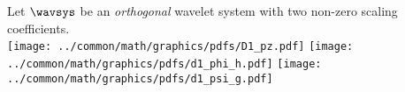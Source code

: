\begin{example}
\label{ex:ortho_n=2}
Let $\wavsys$ be an \emph{orthogonal} wavelet system with two non-zero scaling coefficients.
%
\\\indentx\texttt{[image: ../common/math/graphics/pdfs/D1\_pz.pdf]}
     \quad\texttt{[image: ../common/math/graphics/pdfs/d1\_phi\_h.pdf]}
     \quad\texttt{[image: ../common/math/graphics/pdfs/d1\_psi\_g.pdf]}
\end{example}
